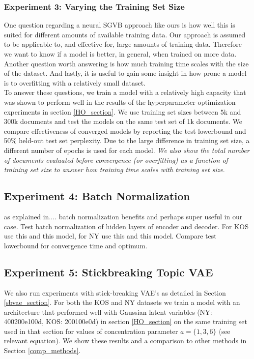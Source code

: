 \documentclass{report}
\begin{document}
	
	\subsubsection{Experiment 3: Varying the Training Set Size}
	One question regarding a neural SGVB approach like ours is how well this is suited for different amounts of available training data. Our approach is assumed to be applicable to, and effective for,  large amounts of training data. Therefore we want to know if a model is better, in general, when trained on more data. Another question worth answering is how much training time scales with the size of the dataset. And lastly, it is useful to gain some insight in how prone a model is to overfitting with a relatively small dataset.\\
	To answer these questions, we train a model with a relatively high capacity that was shown to perform well in the results of the hyperparameter optimization experiments in section \ref{HO_section}. We use training set sizes between 5k and 300k documents and test the models on the same test set of 1k documents. We compare effectiveness of converged models by reporting the test lowerbound and 50\% held-out test set perplexity. Due to the large difference in training set size, a different number of epochs is used for each model. \textit{We also show the total number of documents evaluated before convergence (or overfitting) as a function of training set size to answer how training time scales with training set size}.
	\subsection{Experiment 4: Batch Normalization}\label{batch_norm}
	as explained in.... batch normalization benefits and perhaps super useful in our case. Test batch normalization of hidden layers of encoder and decoder. For KOS use this and this model, for NY use this and this model. Compare test lowerbound for convergence time and optimum. 
	\subsection{Experiment 5: Stickbreaking Topic VAE}\label{sbvae_exp}
	
	We also run experiments with stick-breaking VAE's as detailed in Section \ref{sbvae_section}. For both the KOS and NY datasets we train a model with an architecture that performed well with Gaussian latent variables (NY: 400200e100d, KOS: 200100e0d) in section \ref{HO_section} on the same training set used in that section for values of concentration parameter $a= \{1,3,6\}$ (see relevant equation). We show these results and a comparison to other methods in Section \ref{comp_methods}.
	
\end{document}
